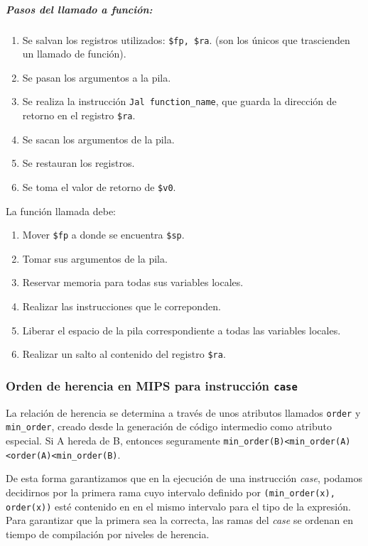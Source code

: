 \documentclass[a4paper,10pt,twocolumn]{article}
\begin{document}
\subparagraph{Pasos del llamado a función:}
		\begin{enumerate}
			\item Se salvan los registros utilizados: \lstinline|$fp, $ra|. (son los únicos que trascienden un llamado de función).
			\item Se pasan los argumentos a la pila.
			\item Se realiza la instrucción \lstinline|Jal function_name|, que guarda la dirección de retorno en el registro \lstinline|$ra|.
			\item Se sacan los argumentos de la pila. 
			\item Se restauran los registros. 
			\item Se toma el valor de retorno de \lstinline|$v0|. 
		\end{enumerate}
	La función llamada debe:
		\begin{enumerate}
			\item Mover \lstinline|$fp| a donde se encuentra \lstinline|$sp|. 
			\item Tomar sus argumentos de la pila. 
			\item Reservar memoria para todas sus variables locales. 
			\item Realizar las instrucciones que le correponden. 
			\item Liberar el espacio de la pila correspondiente a todas las variables locales. 
			\item Realizar un salto al contenido del registro \lstinline|$ra|. 
		\end{enumerate}


\subsubsection{Orden de herencia en MIPS para instrucción \lstinline|case|}
La relación de herencia se determina a través de unos atributos llamados \lstinline|order| y \lstinline|min_order|, creado desde la generación de código intermedio como atributo especial. Si A hereda de B, entonces seguramente \lstinline|min_order(B)<min_order(A)<order(A)<min_order(B)|. 

De esta forma garantizamos que en la ejecución de una instrucción \textit{case}, podamos decidirnos por la primera rama cuyo intervalo definido por \lstinline|(min_order(x), order(x))| esté contenido en en el mismo intervalo para el tipo de la expresión. Para garantizar que la primera sea la correcta, las ramas del \textit{case} se ordenan en tiempo de compilación por niveles de herencia.  
\end{document}
